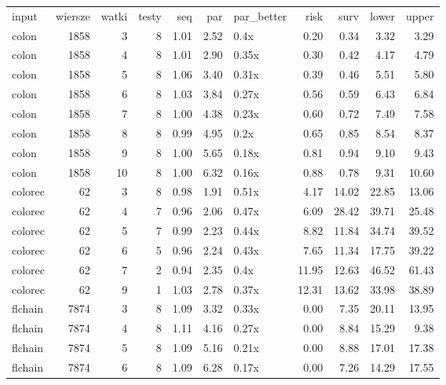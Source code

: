 \begin{table}[ht]
\centering
\begin{tabular}{lrrrrrlrrrr}
 input & wiersze & watki & testy & seq & par & par\_better & risk & surv & lower & upper \\ 
 colon & 1858 &   3 &   8 & 1.01 & 2.52 & 0.4x & 0.20 & 0.34 & 3.32 & 3.29 \\ 
   \hline
colon & 1858 &   4 &   8 & 1.01 & 2.90 & 0.35x & 0.30 & 0.42 & 4.17 & 4.79 \\ 
   \hline
colon & 1858 &   5 &   8 & 1.06 & 3.40 & 0.31x & 0.39 & 0.46 & 5.51 & 5.80 \\ 
   \hline
colon & 1858 &   6 &   8 & 1.03 & 3.84 & 0.27x & 0.56 & 0.59 & 6.43 & 6.84 \\ 
   \hline
colon & 1858 &   7 &   8 & 1.00 & 4.38 & 0.23x & 0.60 & 0.72 & 7.49 & 7.58 \\ 
   \hline
colon & 1858 &   8 &   8 & 0.99 & 4.95 & 0.2x & 0.65 & 0.85 & 8.54 & 8.37 \\ 
   \hline
colon & 1858 &   9 &   8 & 1.00 & 5.65 & 0.18x & 0.81 & 0.94 & 9.10 & 9.43 \\ 
   \hline
colon & 1858 &  10 &   8 & 1.00 & 6.32 & 0.16x & 0.88 & 0.78 & 9.31 & 10.60 \\ 
   \hline
colorec &  62 &   3 &   8 & 0.98 & 1.91 & 0.51x & 4.17 & 14.02 & 22.85 & 13.06 \\ 
   \hline
colorec &  62 &   4 &   7 & 0.96 & 2.06 & 0.47x & 6.09 & 28.42 & 39.71 & 25.48 \\ 
   \hline
colorec &  62 &   5 &   7 & 0.99 & 2.23 & 0.44x & 8.82 & 11.84 & 34.74 & 39.52 \\ 
   \hline
colorec &  62 &   6 &   5 & 0.96 & 2.24 & 0.43x & 7.65 & 11.34 & 17.75 & 39.22 \\ 
   \hline
colorec &  62 &   7 &   2 & 0.94 & 2.35 & 0.4x & 11.95 & 12.63 & 46.52 & 61.43 \\ 
   \hline
colorec &  62 &   9 &   1 & 1.03 & 2.78 & 0.37x & 12.31 & 13.62 & 33.98 & 38.89 \\ 
   \hline
flchain & 7874 &   3 &   8 & 1.09 & 3.32 & 0.33x & 0.00 & 7.35 & 20.11 & 13.95 \\ 
   \hline
flchain & 7874 &   4 &   8 & 1.11 & 4.16 & 0.27x & 0.00 & 8.84 & 15.29 & 9.38 \\ 
   \hline
flchain & 7874 &   5 &   8 & 1.09 & 5.16 & 0.21x & 0.00 & 8.88 & 17.01 & 17.38 \\ 
   \hline
flchain & 7874 &   6 &   8 & 1.09 & 6.28 & 0.17x & 0.00 & 7.26 & 14.29 & 17.55 \\ 

\end{tabular}
\end{table}
